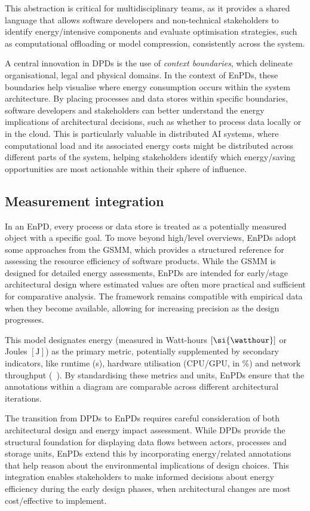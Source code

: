 This abstraction is critical for multidisciplinary teams, as it provides a shared language that allows software developers and non-technical stakeholders to identify energy\-/intensive components and evaluate optimisation strategies, such as computational offloading or model compression, consistently across the system.

A central innovation in DPDs is the use of \emph{context boundaries}, which delineate organisational, legal and physical domains.
In the context of EnPDs, these boundaries help visualise where energy consumption occurs within the system architecture.
By placing processes and data stores within specific boundaries, software developers and stakeholders can better understand the energy implications of architectural decisions, such as whether to process data locally or in the cloud.
This is particularly valuable in distributed AI systems, where computational load and its associated energy costs might be distributed across different parts of the system, helping stakeholders identify which energy\-/saving opportunities are most actionable within their sphere of influence.

\subsection{Measurement integration}
In an EnPD, every process or data store is treated as a potentially measured object with a specific goal.
To move beyond high\-/level overviews, EnPDs adopt some approaches from the GSMM, which provides a structured reference for assessing the resource efficiency of software products.
While the GSMM is designed for detailed energy assessments, EnPDs are intended for early\-/stage architectural design where estimated values are often more practical and sufficient for comparative analysis.
The framework remains compatible with empirical data when they become available, allowing for increasing precision as the design progresses.

This model designates energy (measured in Watt-hours $[\si{\watthour}]$ or Joules $[\si{\joule}]$) as the primary metric, potentially supplemented by secondary indicators, like runtime (\si{\second}), hardware utilisation (CPU/GPU, in \si{\percent}) and network throughput (\si{\mega\byte}).
By standardising these metrics and units, EnPDs ensure that the annotations within a diagram are comparable across different architectural iterations.

The transition from DPDs to EnPDs requires careful consideration of both architectural design and energy impact assessment.
While DPDs provide the structural foundation for displaying data flows between actors, processes and storage units, EnPDs extend this by incorporating energy\-/related annotations that help reason about the environmental implications of design choices.
This integration enables stakeholders to make informed decisions about energy efficiency during the early design phases, when architectural changes are most cost\-/effective to implement.

